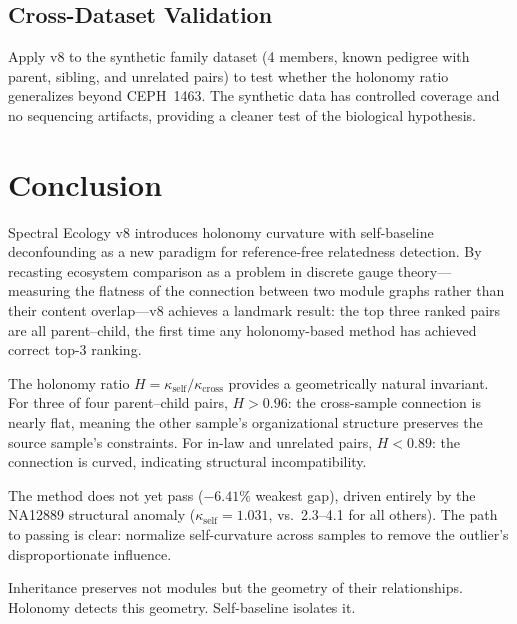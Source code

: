\documentclass{../yalumba}
\begin{document}
\subsection{Cross-Dataset Validation}

Apply v8 to the synthetic family dataset (4 members, known pedigree with
parent, sibling, and unrelated pairs) to test whether the holonomy ratio
generalizes beyond CEPH~1463.  The synthetic data has controlled coverage
and no sequencing artifacts, providing a cleaner test of the biological
hypothesis.


\section{Conclusion}
\label{sec:conclusion}

Spectral Ecology v8 introduces holonomy curvature with self-baseline
deconfounding as a new paradigm for reference-free relatedness detection.
By recasting ecosystem comparison as a problem in discrete gauge theory---measuring
the flatness of the connection between two module graphs rather than their
content overlap---v8 achieves a landmark result: the top three ranked
pairs are all parent--child, the first time any holonomy-based method has
achieved correct top-3 ranking.


The holonomy ratio $H = \kappa_{\text{self}} / \kappa_{\text{cross}}$
provides a geometrically natural invariant.  For three of four parent--child
pairs, $H > 0.96$: the cross-sample connection is nearly flat, meaning the
other sample's organizational structure preserves the source sample's
constraints.  For in-law and unrelated pairs, $H < 0.89$: the connection
is curved, indicating structural incompatibility.

The method does not yet pass ($-6.41\%$ weakest gap), driven entirely by
the NA12889 structural anomaly ($\kappa_{\text{self}} = 1.031$, vs.\
2.3--4.1 for all others).  The path to passing is clear: normalize
self-curvature across samples to remove the outlier's disproportionate
influence.

\begin{pullquote}
Inheritance preserves not modules but the geometry of their relationships.\\
Holonomy detects this geometry.  Self-baseline isolates it.
\end{pullquote}
\end{document}
